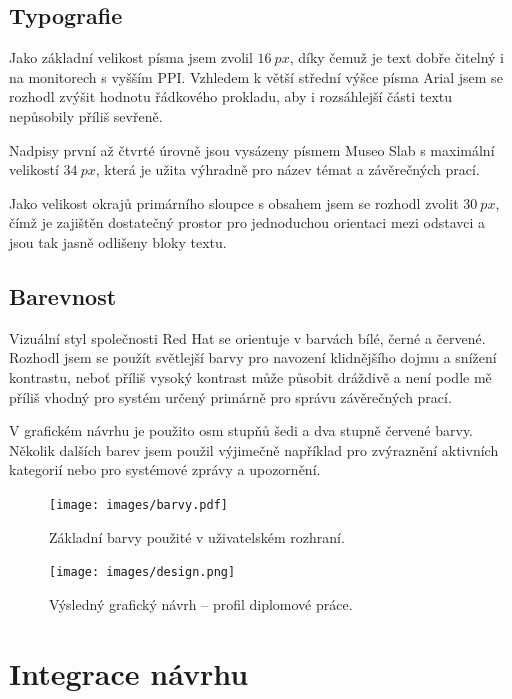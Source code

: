 \subsection{Typografie}

Jako základní velikost písma jsem zvolil $16~px$, díky čemuž je text dobře čitelný i na monitorech s vyšším PPI. Vzhledem k větší střední výšce písma Arial jsem se rozhodl zvýšit hodnotu řádkového prokladu, aby i rozsáhlejší části textu nepůsobily příliš sevřeně.

Nadpisy první až čtvrté úrovně jsou vysázeny písmem Museo Slab s maximální velikostí $34~px$, která je užita výhradně pro název témat a závěrečných prací.

Jako velikost okrajů primárního sloupce s obsahem jsem se rozhodl zvolit $30~px$, čímž je zajištěn dostatečný prostor pro jednoduchou orientaci mezi odstavci a jsou tak jasně odlišeny bloky textu.

\subsection{Barevnost}

Vizuální styl společnosti Red Hat se orientuje v barvách bílé, černé a červené. Rozhodl jsem se použít světlejší barvy pro navození klidnějšího dojmu a snížení kontrastu, neboť příliš vysoký kontrast může působit dráždivě a není podle mě příliš vhodný pro systém určený primárně pro správu závěrečných prací.

V grafickém návrhu je použito osm stupňů šedi a dva stupně červené barvy. Několik dalších barev jsem použil výjimečně například pro zvýraznění aktivních kategorií nebo pro systémové zprávy a upozornění.

\begin{figure}[htbp]
    \centering
    \texttt{[image: images/barvy.pdf]}
    \caption{Základní barvy použité v uživatelském rozhraní.}
    \label{img:colors}
\end{figure}

\begin{figure}[htbp]
    \centering
    \texttt{[image: images/design.png]}
    \caption{Výsledný grafický návrh -- profil diplomové práce.}
    \label{img:design}
\end{figure}

\section{Integrace návrhu}

